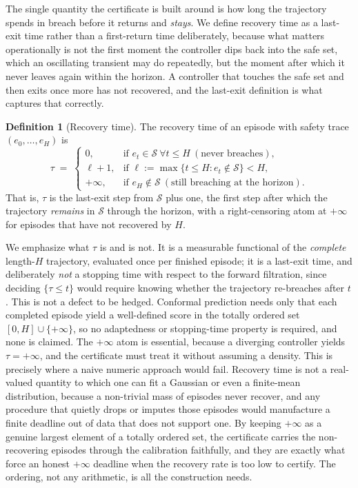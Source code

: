 \documentclass[journal]{IEEEtran}
\theoremstyle{plain}
\theoremstyle{definition}
\newtheorem{definition}{Definition}
\newcommand{\Sset}{\mathcal{S}}
\begin{document}
The single quantity the certificate is built around is how long the trajectory spends in
breach before it returns and \emph{stays}. We define recovery time as a last-exit time rather
than a first-return time deliberately, because what matters operationally is not the first
moment the controller dips back into the safe set, which an oscillating transient may do
repeatedly, but the moment after which it never leaves again within the horizon. A
controller that touches the safe set and then exits once more has not recovered, and the
last-exit definition is what captures that correctly.

\begin{definition}[Recovery time]
\label{def:recovery}
The recovery time of an episode with safety trace $(e_0,\dots,e_H)$ is
\[
  \tau \;=\;
  \begin{cases}
    0, & \text{if } e_t \in \Sset \ \forall t \le H \ (\text{never breaches}),\\
    \ell+1, & \text{if } \ell := \max\{t \le H : e_t \notin \Sset\} < H,\\
    +\infty, & \text{if } e_H \notin \Sset \ (\text{still breaching at the horizon}).
  \end{cases}
\]
That is, $\tau$ is the last-exit step from $\Sset$ plus one, the first step after which the
trajectory \emph{remains} in $\Sset$ through the horizon, with a right-censoring atom at
$+\infty$ for episodes that have not recovered by $H$.
\end{definition}

We emphasize what $\tau$ is and is not. It is a measurable functional of the
\emph{complete} length-$H$ trajectory, evaluated once per finished episode; it is a last-exit
time, and deliberately \emph{not} a stopping time with respect to the forward filtration,
since deciding $\{\tau\le t\}$ would require knowing whether the trajectory re-breaches after
$t$. This is not a defect to be hedged. Conformal prediction needs only that each completed
episode yield a well-defined score in the totally ordered set $[0,H]\cup\{+\infty\}$, so no
adaptedness or stopping-time property is required, and none is claimed. The $+\infty$ atom is
essential, because a diverging
controller yields $\tau=+\infty$, and the certificate must treat it without assuming a
density. This is precisely where a naive numeric approach would fail. Recovery time is not a
real-valued quantity to which one can fit a Gaussian or even a finite-mean distribution,
because a non-trivial mass of episodes never recover, and any procedure that quietly drops or
imputes those episodes would manufacture a finite deadline out of data that does not support
one. By keeping $+\infty$ as a genuine largest element of a totally ordered set, the
certificate carries the non-recovering episodes through the calibration faithfully, and they
are exactly what force an honest $+\infty$ deadline when the recovery rate is too low to
certify. The ordering, not any arithmetic, is all the construction needs.
\end{document}
